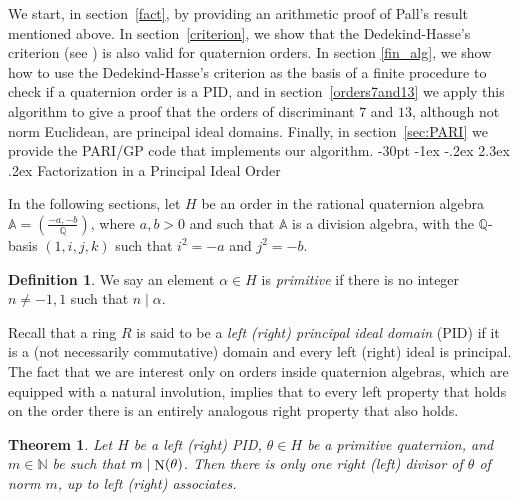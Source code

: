 \documentclass[10pt]{article}
\makeatletter
\renewcommand\section{\@startsection {section}{1}{\z@} {-30pt \@plus
    -1ex \@minus -.2ex} {2.3ex \@plus.2ex}
  {\normalfont\normalsize\bfseries\boldmath}}
\newtheorem{theorem}{Theorem}
\theoremstyle{definition}
\newtheorem{definition}{Definition}
\newcommand\A{\mathbb{A}}
\newcommand\NN{\mathbb{N}}
\newcommand\QQ{\mathbb{Q}}
\newcommand\N{\mathop{\rm N}\nolimits}
\makeatother
\begin{document}
We start, in section~\ref{fact}, by providing an arithmetic proof of
Pall's result mentioned above.  In section~\ref{criterion}, we show
that the Dedekind-Hasse's criterion (see \cite[Thm.~9.5,
p.~124]{Pollard_Diamond}) is also valid for quaternion orders.  In
section \ref{fin_alg}, we show how to use the Dedekind-Hasse's
criterion as the basis of a finite procedure to check if a quaternion
order is a PID, and in section~\ref{orders7and13} we apply this
algorithm to give a proof that the orders of discriminant $7$ and
$13$, although not norm Euclidean, are principal ideal
domains. Finally, in section~\ref{sec:PARI} we provide the PARI/GP
code that implements our algorithm.
\section{Factorization in a Principal Ideal Order}\label{fact}

In the following sections, let $H$ be an order in the rational
quaternion algebra $\A = \left ( \frac{-a,-b}{\QQ} \right)$, where
$a,b>0$ and such that $\A$ is a division algebra, with the $\QQ$-basis
$(1, i, j,k)$ such that $i^2=-a$ and $j^2=-b$.

\begin{definition}
  We say an element $\alpha \in H$ is \textit{primitive} if there is
  no integer $n \neq -1,1$ such that $n \mid \alpha$.
\end{definition}

Recall that a ring $R$ is said to be a \textit{left (right) principal
  ideal domain} (PID) if it is a (not necessarily commutative) domain
and every left (right) ideal is principal. The fact that we are
interest only on orders inside quaternion algebras, which are equipped
with a natural involution, implies that to every left property that
holds on the order there is an entirely analogous right property that
also holds.

\begin{theorem}\label{divisor}
  Let $H$ be a left (right) PID, $\theta \in H$ be a primitive
  quaternion, and $m \in \NN$ be such that $ m \mid \N(\theta)$. Then
  there is only one right (left) divisor of $\theta$ of norm $m$, up
  to left (right) associates.
\end{theorem}
\end{document}
